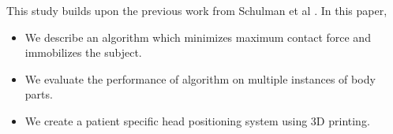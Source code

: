 This study builds upon the previous work from Schulman et al 
\cite{schulman2011grasping}. In this paper,
\begin{itemize}
\item We describe an algorithm which minimizes maximum contact force and 
immobilizes the subject.
\item We evaluate the performance of algorithm on multiple instances of  
body parts.
\item We create a patient specific head positioning system using 3D printing.

\end{itemize}


